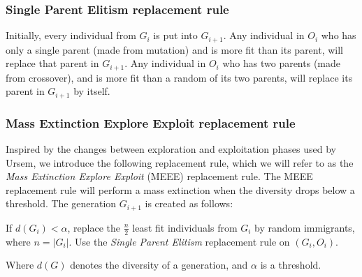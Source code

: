 \subsubsection{Single Parent Elitism replacement rule}
Initially, every individual from $G_i$ is put into $G_{i+1}$.
Any individual in $O_i$ who has only a single parent (made from mutation) and is more fit than its parent, will replace that parent in $G_{i+1}$.
Any individual in $O_i$ who has two parents (made from crossover), and is more fit than a random of its two parents, will replace its parent in $G_{i+1}$ by itself.

\subsubsection{Mass Extinction Explore Exploit replacement rule}
Inspired by the changes between exploration and exploitation phases used by Ursem\cite{ursem2002diversity}, we introduce the following replacement rule, which we will refer to as the \emph{Mass Extinction Explore Exploit} (MEEE) replacement rule.
The MEEE replacement rule will perform a mass extinction when the diversity drops below a threshold.
The generation $G_{i+1}$ is created as follows:

If $d(G_i) < \alpha$, replace the $\frac{n}{2}$ least fit individuals from $G_i$ by random immigrants, where $n = \lvert G_i \rvert$.
Use the \emph{Single Parent Elitism} replacement rule on $(G_i, O_i)$.

Where $d(G)$ denotes the diversity of a generation, and $\alpha$ is a threshold. 



